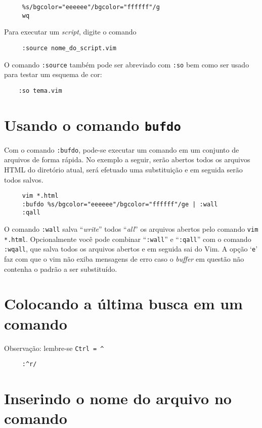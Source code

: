 \begin{verbatim}
     %s/bgcolor="eeeeee"/bgcolor="ffffff"/g
     wq
\end{verbatim}

Para executar um {\em script}, digite o comando

\begin{verbatim}
     :source nome_do_script.vim
\end{verbatim}

O comando {\tt :source} também pode ser abreviado com {\tt :so}
bem como ser usado para testar um esquema de cor:

\begin{verbatim}
    :so tema.vim
\end{verbatim}

\section{Usando o comando {\tt bufdo}}\label{Usando o comando bufdo}

Com o comando {\tt :bufdo}, pode-se executar um comando em um
conjunto de arquivos de forma rápida. No exemplo a seguir, serão abertos
todos os arquivos HTML do diretório atual, será efetuado uma substituição
e em seguida serão todos salvos.

\begin{verbatim}
     vim *.html
     :bufdo %s/bgcolor="eeeeee"/bgcolor="ffffff"/ge | :wall
     :qall
\end{verbatim}

O comando {\tt :wall} salva ``{\em write}'' todos ``{\em all}'' os arquivos
abertos pelo comando {\tt vim *.html}. Opcionalmente você pode
combinar ``{\tt :wall}'' e ``{\tt :qall}'' com o comando {\tt :wqall}, que
salva todos os arquivos abertos e em seguida sai do Vim. A opção `{\tt e}' 
faz com que o vim não exiba mensagens de erro caso o {\em buffer} em questão não 
contenha o padrão a ser substituído.

\section{Colocando a última busca em um comando }
Observação: lembre-se \verb|Ctrl = ^|

\begin{verbatim}
     :^r/
\end{verbatim}

\section{Inserindo o nome do arquivo no comando }

